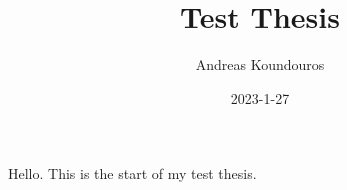 \documentclass[12pt]{book}
\title{Test Thesis}
\author{Andreas Koundouros}
\date{2023-1-27}
\begin{document}
\maketitle

Hello. This is the start of my test thesis.
\end{document}
